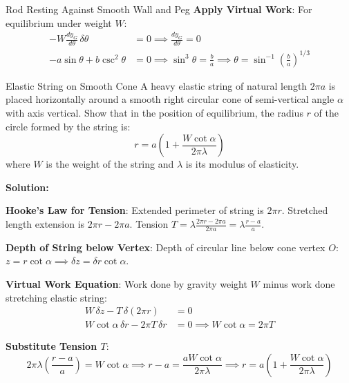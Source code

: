 \begin{examplebox}{Rod Resting Against Smooth Wall and Peg}
\textbf{Apply Virtual Work}:
    For equilibrium under weight $W$:
    \begin{align*}
        -W \frac{d y_G}{d\theta} \, \delta\theta &= 0 \implies \frac{d y_G}{d\theta} = 0 \\
        -a \sin\theta + b \csc^2\theta &= 0 \implies \sin^3\theta = \frac{b}{a} \implies \theta = \sin^{-1}\left(\frac{b}{a}\right)^{1/3}
    \end{align*}
\end{examplebox}

\begin{examplebox}{Elastic String on Smooth Cone}
A heavy elastic string of natural length $2\pi a$ is placed horizontally around a smooth right circular cone of semi-vertical angle $\alpha$ with axis vertical. Show that in the position of equilibrium, the radius $r$ of the circle formed by the string is:
\begin{equation*}
    r = a \left( 1 + \frac{W \cot\alpha}{2\pi \lambda} \right)
\end{equation*}
where $W$ is the weight of the string and $\lambda$ is its modulus of elasticity.

\tcblower
\textbf{Solution:}


\textbf{Hooke's Law for Tension}:
    Extended perimeter of string is $2\pi r$. Stretched length extension is $2\pi r - 2\pi a$.
    Tension $T = \lambda \frac{2\pi r - 2\pi a}{2\pi a} = \lambda \frac{r - a}{a}$.

\textbf{Depth of String below Vertex}:
    Depth of circular line below cone vertex $O$: $z = r \cot\alpha \implies \delta z = \delta r \cot\alpha$.

\textbf{Virtual Work Equation}:
    Work done by gravity weight $W$ minus work done stretching elastic string:
    \begin{align*}
        W \, \delta z - T \, \delta(2\pi r) &= 0 \\
        W \cot\alpha \, \delta r - 2\pi T \, \delta r &= 0 \implies W \cot\alpha = 2\pi T
    \end{align*}

\textbf{Substitute Tension $T$}:
    \begin{equation*}
        2\pi \lambda \left(\frac{r - a}{a}\right) = W \cot\alpha \implies r - a = \frac{a W \cot\alpha}{2\pi \lambda} \implies r = a\left(1 + \frac{W \cot\alpha}{2\pi \lambda}\right)
    \end{equation*}
\end{examplebox}
